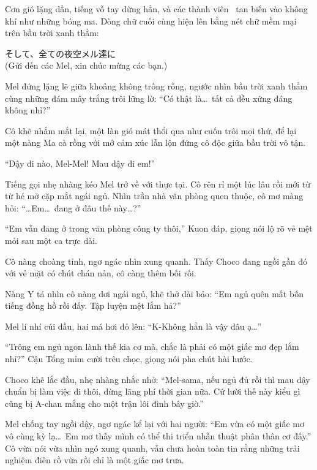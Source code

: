 \documentclass[../main.tex]{subfiles}
\begin{document}
Cơn gió lặng dần, tiếng vỗ tay dừng hẳn, và các thành viên \hll\ tan biến vào không khí như những bóng ma. Dòng chữ cuối cùng hiện lên bằng nét chữ mềm mại trên bầu trời xanh thẳm:
\begin{center}
  そして、全ての夜空メル達に\\(Gửi đến các Mel, xin chúc mừng các bạn.)
\end{center}

Mel đứng lặng lẽ giữa khoảng không trống rỗng, ngước nhìn bầu trời xanh thẳm cùng những đám mây trắng trôi lững lờ: ``Có thật là\dots\ tất cả đều xứng đáng không nhỉ?''

Cô khẽ nhắm mắt lại, một làn gió mát thổi qua như cuốn trôi mọi thứ, để lại một nàng Ma cà rồng với mớ cảm xúc lẫn lộn đứng cô độc giữa bầu trời vô tận.

\omk

``Dậy đi nào, Mel-Mel! Mau dậy đi em!''

Tiếng gọi nhẹ nhàng kéo Mel trở về với thực tại. Cô rên rỉ một lúc lâu rồi mới từ từ hé mở cặp mắt ngái ngủ. Nhìn trần nhà văn phòng quen thuộc, cô mơ màng hỏi: ``\dots Em\dots\ đang ở đâu thế này\dots?''

``Em vẫn đang ở trong văn phòng công ty thôi,'' Kuon đáp, giọng nói lộ rõ vẻ mệt mỏi sau một ca trực dài.

Cô nàng choàng tỉnh, ngơ ngác nhìn xung quanh. Thấy Choco đang ngồi gần đó với vẻ mặt có chút chán nản, cô càng thêm bối rối.

Nàng Y tá nhìn cô nàng dơi ngái ngủ, khẽ thở dài bảo: ``Em ngủ quên mất bốn tiếng đồng hồ rồi đấy. Tập luyện mệt lắm hả?''

Mel lí nhí cúi đầu, hai má hơi đỏ lên: ``K-Không hẳn là vậy đâu ạ\dots''

``Trông em ngủ ngon lành thế kia cơ mà, chắc là phải có một giấc mơ đẹp lắm nhỉ?'' Cậu Tổng mỉm cười trêu chọc, giọng nói pha chút hài hước.

Choco khẽ lắc đầu, nhẹ nhàng nhắc nhở: ``Mel-sama, nếu ngủ đủ rồi thì mau dậy chuẩn bị làm việc đi thôi, đừng lãng phí thời gian nữa. Cứ lười thế này kiểu gì cũng bị A-chan mắng cho một trận lôi đình bây giờ.''

Mel chống tay ngồi dậy, ngơ ngác kể lại với hai người: ``Em vừa có một giấc mơ vô cùng kỳ lạ\dots\ Em mơ thấy mình có thể thi triển nhẫn thuật phân thân cơ đấy.'' Cô vừa nói vừa nhìn ngó xung quanh, vẫn chưa hoàn toàn tin rằng những trải nghiệm điên rồ vừa rồi chỉ là một giấc mơ trưa.
\end{document}
